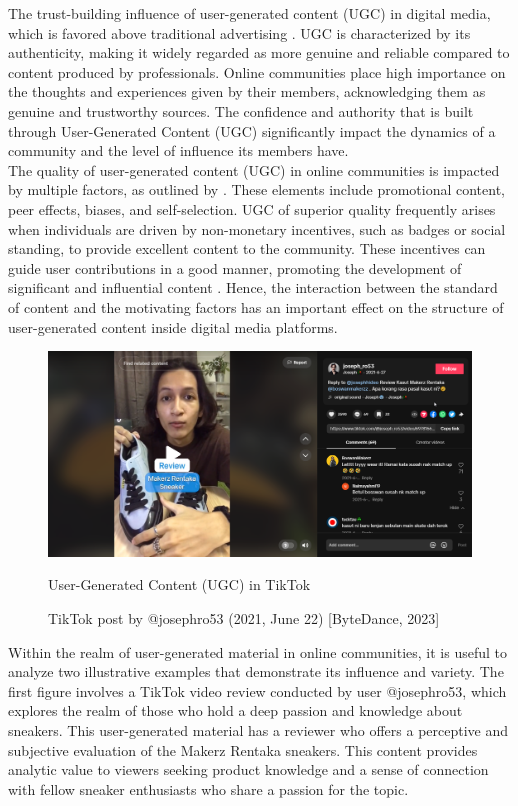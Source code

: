 The trust-building influence of user-generated content (UGC) in digital media, which is favored above traditional advertising \parencite{v22}. UGC is characterized by its authenticity, making it widely regarded as more genuine and reliable compared to content produced by professionals. Online communities place high importance on the thoughts and experiences given by their members, acknowledging them as genuine and trustworthy sources. The confidence and authority that is built through User-Generated Content (UGC) significantly impact the dynamics of a community and the level of influence its members have. \\

The quality of user-generated content (UGC) in online communities is impacted by multiple factors, as outlined by \textcite{luca21}. These elements include promotional content, peer effects, biases, and self-selection. UGC of superior quality frequently arises when individuals are driven by non-monetary incentives, such as badges or social standing, to provide excellent content to the community. These incentives can guide user contributions in a good manner, promoting the development of significant and influential content \parencite{luca21}. Hence, the interaction between the standard of content and the motivating factors has an important effect on the structure of user-generated content inside digital media platforms.\\

\begin{figure}[h]
    \centering
    \includegraphics[width=0.9\linewidth]{mainmatter/images/ugc1.png}
    \caption{User-Generated Content (UGC) in TikTok}
    \caption*{TikTok post by @josephro53 (2021, June 22) [ByteDance, 2023]}
    \label{fig:myfig1}
\end{figure}
Within the realm of user-generated material in online communities, it is useful to analyze two illustrative examples that demonstrate its influence and variety. The first figure involves a TikTok video review conducted by user @josephro53, which explores the realm of those who hold a deep passion and knowledge about sneakers. This user-generated material has a reviewer who offers a perceptive and subjective evaluation of the Makerz Rentaka sneakers. This content provides analytic value to viewers seeking product knowledge and a sense of connection with fellow sneaker enthusiasts who share a passion for the topic. \\

